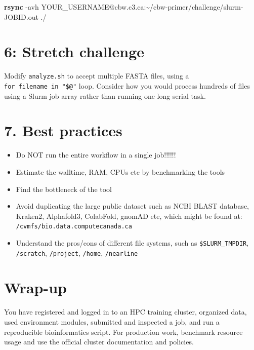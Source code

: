 \documentclass[
]{book}
\newenvironment{Shaded}{\begin{snugshade}}{\end{snugshade}}
\newcommand{\AttributeTok}[1]{\textcolor[rgb]{0.13,0.29,0.53}{#1}}
\newcommand{\FunctionTok}[1]{\textcolor[rgb]{0.13,0.29,0.53}{\textbf{#1}}}
\newcommand{\NormalTok}[1]{#1}
\providecommand{\tightlist}{%
  \setlength{\itemsep}{0pt}\setlength{\parskip}{0pt}}
\begin{document}
\begin{Shaded}
\begin{Highlighting}[]
\FunctionTok{rsync} \AttributeTok{{-}avh}\NormalTok{ YOUR\_USERNAME@cbw.c3.ca:\textasciitilde{}/cbw{-}primer/challenge/slurm{-}JOBID.out ./}
\end{Highlighting}
\end{Shaded}

\section{6: Stretch challenge}\label{stretch-challenge}

Modify \texttt{analyze.sh} to accept multiple FASTA files, using a \texttt{for\ filename\ in\ "\$@"} loop. Consider how you would process hundreds of files using a Slurm job array rather than running one long serial task.

\section{7. Best practices}\label{best-practices}

\begin{itemize}
\tightlist
\item
  Do NOT run the entire workflow in a single job!!!!!!
\item
  Estimate the walltime, RAM, CPUs etc by benchmarking the tools
\item
  Find the bottleneck of the tool
\item
  Avoid duplicating the large public dataset such as NCBI BLAST database, Kraken2, Alphafold3, ColabFold, gnomAD ete, which might be found at: \texttt{/cvmfs/bio.data.computecanada.ca}
\item
  Understand the pros/cons of different file systems, such as \texttt{\$SLURM\_TMPDIR}, \texttt{/scratch}, \texttt{/project}, \texttt{/home}, \texttt{/nearline}
\end{itemize}

\section{Wrap-up}\label{wrap-up}

You have registered and logged in to an HPC training cluster, organized data, used environment modules, submitted and inspected a job, and run a reproducible bioinformatics script. For production work, benchmark resource usage and use the official cluster documentation and policies.


\end{document}
